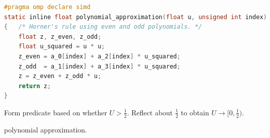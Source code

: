 \begin{lstfloat}[!htb]
\begin{lstlisting}[language=C, caption={[Cubic]An application of Horner's rule.}, label=code:c:piecewise_cubic_approximation_horners_rule_polynomial_splitting, captionpos=b]
#pragma omp declare simd
static inline float polynomial_approximation(float u, unsigned int index)
{   /* Horner's rule using even and odd polynomials. */
    float z, z_even, z_odd;
    float u_squared = u * u;
    z_even = a_0[index] + a_2[index] * u_squared;
    z_odd  = a_1[index] + a_3[index] * u_squared;
    z = z_even + z_odd * u;
    return z;
}
\end{lstlisting}
\end{lstfloat}

\begin{algorithm}[htb]
    \DontPrintSemicolon
    \KwIn{Floating point uniform random number $ U \in [0, 1) $.}
    Form predicate based on whether $ U > \tfrac{1}{2} $.\;
    Reflect about $ \tfrac{1}{2} $ to obtain $ U \to [0, \tfrac{1}{2}) $.\;
    \caption[Polynomial]{polynomial approximation.}
    \label{algo:polynomial}
\end{algorithm}

    \lipsum 

\clearpage

